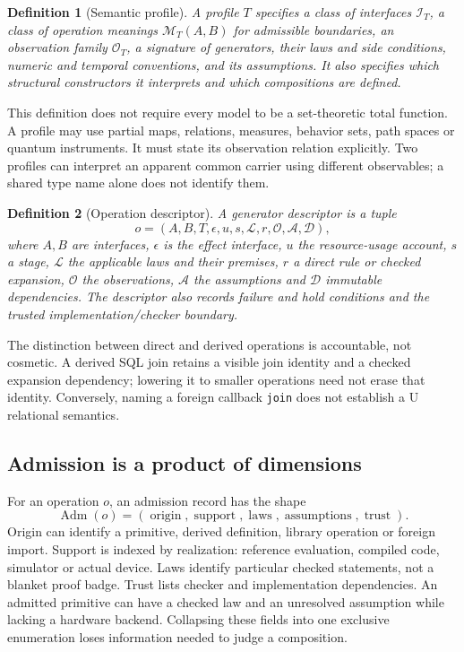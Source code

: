 \documentclass[11pt]{article}
\newtheorem{definition}{Definition}[section]
\theoremstyle{remark}
\begin{document}
\begin{definition}[Semantic profile]
A profile $T$ specifies a class of interfaces $\mathcal I_T$, a class of
operation meanings $\mathcal M_T(A,B)$ for admissible boundaries, an
observation family $\mathcal O_T$, a signature of generators, their laws and
side conditions, numeric and temporal conventions, and its assumptions.
It also specifies which structural constructors it interprets and which
compositions are defined.
\end{definition}

This definition does not require every model to be a set-theoretic total
function. A profile may use partial maps, relations, measures, behavior
sets, path spaces or quantum instruments. It must state its observation
relation explicitly. Two profiles can interpret an apparent common carrier
using different observables; a shared type name alone does not identify them.

\begin{definition}[Operation descriptor]
A generator descriptor is a tuple
\[
 o=(A,B,T,\epsilon,u,s,\mathcal L,r,\mathcal O,\mathcal A,\mathcal D),
\]
where $A,B$ are interfaces, $\epsilon$ is the effect interface, $u$ the
resource-usage account, $s$ a stage, $\mathcal L$ the applicable laws and
their premises, $r$ a direct rule or checked expansion, $\mathcal O$ the
observations, $\mathcal A$ the assumptions and $\mathcal D$ immutable
dependencies. The descriptor also records failure and hold conditions and
the trusted implementation/checker boundary.
\end{definition}

The distinction between direct and derived operations is accountable, not
cosmetic. A derived SQL join retains a visible join identity and a checked
expansion dependency; lowering it to smaller operations need not erase that
identity. Conversely, naming a foreign callback \texttt{join} does not
establish a U relational semantics.

\subsection{Admission is a product of dimensions}

For an operation $o$, an admission record has the shape
\[
\operatorname{Adm}(o)=
(\operatorname{origin},\operatorname{support},
 \operatorname{laws},\operatorname{assumptions},\operatorname{trust}).
\]
Origin can identify a primitive, derived definition, library operation or
foreign import. Support is indexed by realization: reference evaluation,
compiled code, simulator or actual device. Laws identify particular checked
statements, not a blanket proof badge. Trust lists checker and implementation
dependencies. An admitted primitive can have a checked law and an unresolved
assumption while lacking a hardware backend. Collapsing these fields into one
exclusive enumeration loses information needed to judge a composition.
\end{document}
